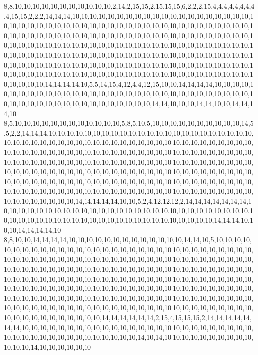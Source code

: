 8,8,10,10,10,10,10,10,10,10,10,10,10,2,14,2,15,15,2,15,15,15,6,2,2,2,15,4,4,4,4,4,4,4,4,4,15,15,2,2,2,14,14,14,10,10,10,10,10,10,10,10,10,10,10,10,10,10,10,10,10,10,10,10,10,10,10,10,10,10,10,10,10,10,10,10,10,10,10,10,10,10,10,10,10,10,10,10,10,10,10,10,10,10,10,10,10,10,10,10,10,10,10,10,10,10,10,10,10,10,10,10,10,10,10,10,10,10,10,10,10,10,10,10,10,10,10,10,10,10,10,10,10,10,10,10,10,10,10,10,10,10,10,10,10,10,10,10,10,10,10,10,10,10,10,10,10,10,10,10,10,10,10,10,10,10,10,10,10,10,10,10,10,10,10,10,10,10,10,10,10,10,10,10,10,10,10,10,10,10,10,10,10,10,10,10,10,10,10,10,10,10,10,10,10,10,10,10,10,10,10,10,10,10,10,10,10,10,10,10,10,10,10,10,10,10,10,10,10,10,10,10,10,10,10,10,10,14,14,14,14,10,5,5,14,15,4,12,4,4,12,15,10,10,14,14,14,14,10,10,10,10,10,10,10,10,10,10,10,10,10,10,10,10,10,10,10,10,10,10,10,10,10,10,10,10,10,10,10,10,10,10,10,10,10,10,10,10,10,10,10,10,10,10,10,10,10,14,14,10,10,10,14,14,10,10,14,14,14,10
8,5,10,10,10,10,10,10,10,10,10,10,10,10,5,8,5,10,5,10,10,10,10,10,10,10,10,10,10,14,5,5,2,2,14,14,14,10,10,10,10,10,10,10,10,10,10,10,10,10,10,10,10,10,10,10,10,10,10,10,10,10,10,10,10,10,10,10,10,10,10,10,10,10,10,10,10,10,10,10,10,10,10,10,10,10,10,10,10,10,10,10,10,10,10,10,10,10,10,10,10,10,10,10,10,10,10,10,10,10,10,10,10,10,10,10,10,10,10,10,10,10,10,10,10,10,10,10,10,10,10,10,10,10,10,10,10,10,10,10,10,10,10,10,10,10,10,10,10,10,10,10,10,10,10,10,10,10,10,10,10,10,10,10,10,10,10,10,10,10,10,10,10,10,10,10,10,10,10,10,10,10,10,10,10,10,10,10,10,10,10,10,10,10,10,10,10,10,10,10,10,10,10,10,10,10,10,10,10,10,10,10,10,10,10,10,10,10,10,10,10,10,10,10,10,10,10,10,10,10,10,10,10,10,10,10,14,14,14,14,14,10,10,5,2,4,12,12,12,2,14,14,14,14,14,14,14,10,10,10,10,10,10,10,10,10,10,10,10,10,10,10,10,10,10,10,10,10,10,10,10,10,10,10,10,10,10,10,10,10,10,10,10,10,10,10,10,10,10,10,10,10,10,10,10,10,10,10,10,14,14,14,10,10,10,14,14,14,14,10
8,8,10,10,14,14,14,14,10,10,10,10,10,10,10,10,10,10,10,10,10,14,14,10,5,10,10,10,10,10,10,10,10,10,10,10,10,10,10,10,10,10,10,10,10,10,10,10,10,10,10,10,10,10,10,10,10,10,10,10,10,10,10,10,10,10,10,10,10,10,10,10,10,10,10,10,10,10,10,10,10,10,10,10,10,10,10,10,10,10,10,10,10,10,10,10,10,10,10,10,10,10,10,10,10,10,10,10,10,10,10,10,10,10,10,10,10,10,10,10,10,10,10,10,10,10,10,10,10,10,10,10,10,10,10,10,10,10,10,10,10,10,10,10,10,10,10,10,10,10,10,10,10,10,10,10,10,10,10,10,10,10,10,10,10,10,10,10,10,10,10,10,10,10,10,10,10,10,10,10,10,10,10,10,10,10,10,10,10,10,10,10,10,10,10,10,10,10,10,10,10,10,10,10,10,10,10,10,10,10,10,10,10,10,10,10,10,10,10,10,10,10,10,10,10,10,10,10,10,10,10,10,10,10,10,10,14,14,14,14,14,14,2,15,4,15,15,15,2,14,14,14,14,14,14,14,10,10,10,10,10,10,10,10,10,10,10,10,10,10,10,10,10,10,10,10,10,10,10,10,10,10,10,10,10,10,10,10,10,10,10,10,10,10,10,10,10,14,10,14,10,10,10,10,10,10,10,10,10,10,10,10,10,14,10,10,10,10,10,10
